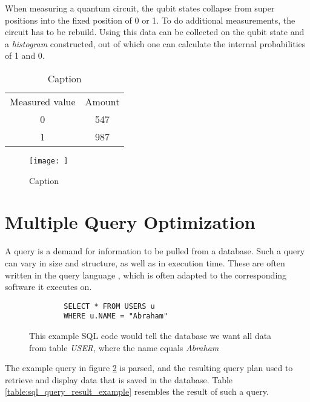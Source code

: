 When measuring a quantum circuit, the qubit states collapse from super positions into the fixed position of 0 or 1. To do additional measurements, the circuit has to be rebuild. Using this data can be collected on the qubit state and a \emph{histogram} constructed, out of which one can calculate the internal probabilities of 1 and 0.

\begin{table}[!h]
    \centering
    \begin{tabular}{c|c}
         Measured value & Amount  \\
         0 & 547 \\
         1 & 987 \\
    \end{tabular}
    \caption{Caption}
    \label{table:my_label}
\end{table}

\begin{figure}[!h]
    \centering
    \texttt{[image: ]}
    \caption{Caption}
    \label{fig:my_label}
\end{figure}




\section{Multiple Query Optimization}

A query\cite{codd_relational_1970} is a demand for information to be pulled from a database. Such a query can vary in size and structure, as well as in execution time. These are often written in the query language , which is often adapted to the corresponding software\cite{shirgoldbird_microsoft_nodate}\cite{the_postgresql_global_development_group_postgresql_2022} it executes on. 

    
\begin{figure}[!h]
    \centering
    \begin{verbatim}
        SELECT * FROM USERS u
        WHERE u.NAME = "Abraham"
    \end{verbatim}
    \caption{This example SQL code would tell the database we want all data from table \emph{USER}, where the name equals \emph{Abraham}}
    \label{figure:sql_query_example}
\end{figure}

The example query in figure \ref{figure:sql_query_example} is parsed, and the resulting query plan used to retrieve and display data that is saved in the database. Table \ref{table:sql_query_result_example} resembles the result of such a query.

